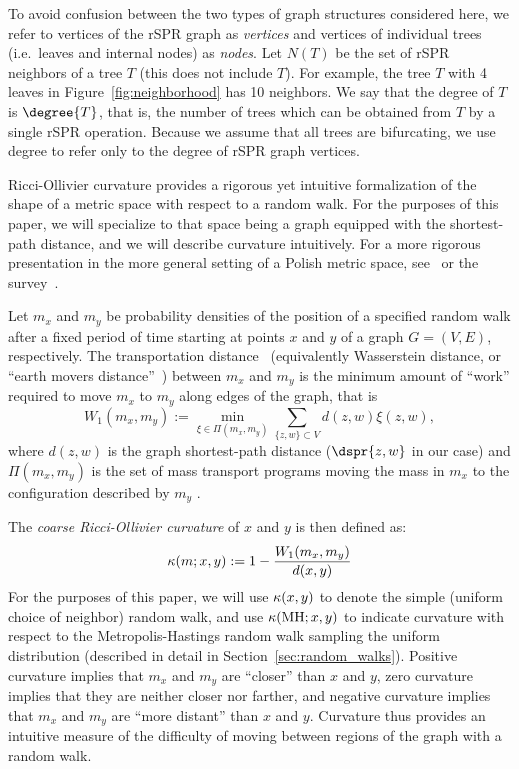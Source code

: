 \documentclass[11pt,onecolumn,conference]{IEEEtran}
\newcommand{\MH}{\operatorname{MH}}
\newcommand{\cuttable}[2][]{%
    \ifthenelse{\equal{#1}{}}%
		{}%
		{#1}%
}
\newcommand{\curvature}[2][]{%
    \ifthenelse{\equal{#1}{}}%
		{\kappa(#2)}%
		{\kappa_{#1}(#2)}%
}
\begin{document}
To avoid confusion between the two types of graph structures considered here, we refer to vertices of the rSPR graph as \emph{vertices} and vertices of individual trees (i.e.\ leaves and internal nodes) as \emph{nodes}.
Let $N(T)$ be the set of rSPR neighbors of a tree $T$ (this does not include $T$).
For example, the tree $T$ with 4 leaves in Figure~\ref{fig:neighborhood} has 10 neighbors.
We say that the degree of $T$ is $\degree{T}$, that is, the number of trees which can be obtained from $T$ by a single rSPR operation.
Because we assume that all trees are bifurcating, we use degree to refer only to the degree of rSPR graph vertices.

Ricci-Ollivier curvature provides a rigorous yet intuitive formalization of the shape of a metric space with respect to a random walk.
For the purposes of this paper, we will specialize to that space being a graph equipped with the shortest-path distance, and we will describe curvature intuitively.
For a more rigorous presentation in the more general setting of a Polish metric space, see~\cite{Ollivier2009-bw} or the survey~\cite{Ollivier2010-ao}.

Let $m_x$ and $m_y$ be probability densities of the position of a specified random walk after a fixed period of time starting at points $x$ and $y$ of a graph $G = (V,E)$, respectively.
The transportation distance~\cite{Villani2003-wv} (equivalently Wasserstein distance, or ``earth movers distance''~\cite{rubner2000earth}) between $m_x$ and $m_y$ is the minimum amount of ``work'' required to move $m_x$ to $m_y$ along edges of the graph, that is
$$ W_1(m_x, m_y) := \min_{\xi \in \Pi(m_x, m_y)} \sum_{\{z,w\} \subset V} d(z,w) \xi(z,w),$$
where $d(z,w)$ is the graph shortest-path distance ($\dspr{z,w}$ in our case) and $\Pi(m_x, m_y)$ is the set of mass transport programs moving the mass in $m_x$ to the configuration described by $m_y$ \cuttable{(more formally, a density on $V \times V$ which is $m_x$ after projecting on the first component and $m_y$ after projecting on the second)}.

The \emph{coarse Ricci-Ollivier curvature} of $x$ and $y$ is then defined as:
\begin{equation}
\curvature{m; x, y} := 1 - \frac{W_1(m_x, m_y)}{d(x, y)}
\label{eq:curvatureDef}
\end{equation}
For the purposes of this paper, we will use $\curvature{x,y}$ to denote the simple (uniform choice of neighbor) random walk, and use $\curvature{\MH; x,y}$ to indicate curvature with respect to the Metropolis-Hastings random walk sampling the uniform distribution (described in detail in Section~\ref{sec:random_walks}).
Positive curvature implies that $m_x$ and $m_y$ are ``closer'' than $x$ and $y$, zero curvature implies that they are neither closer nor farther, and negative curvature implies that $m_x$ and $m_y$ are \cuttable{on average }``more distant'' than $x$ and $y$.
Curvature thus provides an intuitive measure of the difficulty of moving between regions of the graph with \cuttable[a]{the given} random walk.
\end{document}
